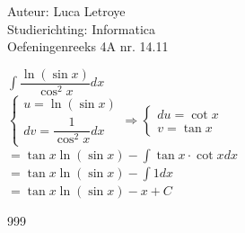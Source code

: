 \documentclass[a4paper]{article}
\begin{document}
  
\noindent \large Auteur: Luca Letroye \\
\noindent \large Studierichting: Informatica\\
\noindent \large Oefeningenreeks 4A nr. 14.11\\

\medskip
\normalsize

$\displaystyle\int \dfrac{\ln (\sin x)}{\cos^2 x}dx$\\

$\left\{
\begin{array}{l}
	u=\ln(\sin x) \\ 
	dv=\dfrac{1}{\cos^2 x}dx
\end{array}\right.
\Rightarrow 
\left\{
\begin{array}{l}
	du= 	\cot x\\
 	v= \tan x
\end{array}
\right.$\\

$= \tan x \ln(\sin x) - \displaystyle\int \tan x \cdot \cot x dx$\\

$= \tan x \ln(\sin x) - \displaystyle\int 1 dx$\\

$= \tan x \ln(\sin x) - x + C$\\



\begin{thebibliography}{999}
\end{thebibliography}
\end{document}
